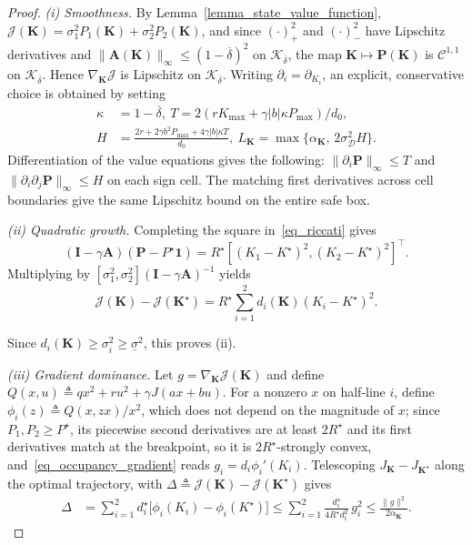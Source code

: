 \documentclass[letterpaper, 10 pt, conference]{ieeeconf}
\newcommand{\bA}{\mathbf{A}}
\newcommand{\bI}{\mathbf{I}}
\newcommand{\bK}{\mathbf{K}}
\newcommand{\bP}{\mathbf{P}}
\newcommand{\cD}{\mathcal{D}}
\newcommand{\cJ}{\mathcal{J}}
\newcommand{\cK}{\mathcal{K}}
\newcommand{\slo}{\underline{\sigma}}
\newcommand{\Lemm}{Lemma}
\begin{document}
\begin{proof}
\emph{(i) Smoothness.} By \Lemm~\ref{lemma_state_value_function}, $\cJ(\bK)=\sigma_{1}^{2}P_{1}(\bK) + \sigma_{2}^{2}P_{2}(\bK)$, and since $(\cdot)_+^2$ and $(\cdot)_-^2$ have Lipschitz derivatives and $\|\bA(\bK)\|_\infty\le (1 - \overline{\delta})^2$ on $\cK_{\overline\delta}$, the map $\bK \mapsto \bP(\bK)$ is $\mathcal{C}^{1,1}$ on $\cK_{\overline{\delta}}$. Hence $\nabla_{\bK} \cJ$ is Lipschitz on $\cK_{\overline{\delta}}$.
Writing $\partial_i=\partial_{K_i}$, an explicit, conservative choice is obtained by setting
\vspace{-0.1cm}
\[
\begin{aligned}
\kappa&=1-\overline\delta, \ T={2(rK_{\max}+\gamma|b|\kappa P_{\max})}/{d_0},\\
H&=\frac{2r+2\gamma b^2P_{\max}+4\gamma|b|\kappa T}{d_0}, \
L_{\bK}{=}\max\{\alpha_{\bK},\,2\sigma_{\cD}^2H\}.
\end{aligned}
\]
Differentiation of the value equations gives the following:
$\|\partial_i\bP\|_\infty\le T$ and
$\|\partial_i\partial_j\bP\|_\infty\le H$ on each sign cell.
The matching first derivatives across cell boundaries give the same
Lipschitz bound on the entire safe box.

\emph{(ii) Quadratic growth.} Completing the square in~\eqref{eq_riccati} gives
\[
(\bI-\gamma\bA)(\bP-P^\star\mathbf1)
 =R^\star[(K_1-K^\star)^2,(K_2-K^\star)^2]^\top.
\]
Multiplying by $[\sigma_1^2,\sigma_2^2](\bI-\gamma\bA)^{-1}$ yields
\vspace{-0.1cm}
\begin{equation}\label{eq_exact_gap}
\cJ(\bK)-\cJ(\bK^\star)
 =R^\star\sum_{i=1}^2d_i(\bK)(K_i-K^\star)^2.
\end{equation}
\vspace{-0.3cm}

\noindent Since $d_i(\bK)\ge\sigma_i^2\ge\slo^2$, this proves (ii).

\emph{(iii) Gradient dominance.} Let $g=\nabla_{\bK}\cJ(\bK)$ and define $Q(x,u) \triangleq qx^{2}+ru^{2}+\gamma J(ax+bu)$. For a nonzero $x$ on half-line $i$, define $\phi_i(z)\triangleq Q(x,zx)/x^2$, which does not depend on the magnitude of $x$; since $P_1, P_2\ge P^{\star}$, its piecewise second derivatives are at least $2R^{\star}$ and its first derivatives match at the breakpoint, so it is $2R^{\star}$-strongly convex, and~\eqref{eq_occupancy_gradient} reads $g_i=d_i\phi_i'(K_i)$. Telescoping $J_{\bK}-J_{\bK^{\star}}$ along the optimal trajectory, with $ \Delta\triangleq\cJ(\bK)-\cJ(\bK^{\star})$ gives
\begin{equation}
    \begin{aligned}
    \Delta&=\sum_{i=1}^2 d_i^{\star}\bigl[\phi_i(K_i)-\phi_i(K^{\star})\bigr] \le\sum_{i=1}^2\frac{d_i^{\star}}{4R^{\star}d_i^2}\,g_i^2
       \le\frac{\|g\|^2}{2\alpha_{\bK}}.
    \end{aligned}
\end{equation}


\end{proof}
\end{document}
